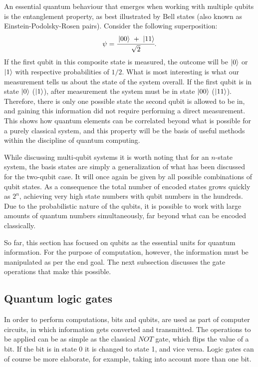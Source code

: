 An essential quantum behaviour that emerges when working with multiple qubits is the entanglement property, as best illustrated by Bell states (also known as Einstein-Podolsky-Rosen pairs). Consider the following superposition:
\begin{equation}
    \psi = \cfrac{\ket{00}\ +\ \ket{11}}{\sqrt{2}}.
\end{equation}
If the first qubit in this composite state is measured, the outcome will be $\ket{0}$ or $\ket{1}$ with respective probabilities of $1/2$. What is most interesting is what our measurement tells us about the state of the system overall. If the first qubit is in state $\ket{0}$ ($\ket{1}$), after measurement the system must be in state $\ket{00}$ ($\ket{11}$). Therefore, there is only one possible state the second qubit is allowed to be in, and gaining this information did not require performing a direct measurement. This shows how quantum elements can be correlated beyond what is possible for a purely classical system, and this property will be the basis of useful methods within the discipline of quantum computing. 

While discussing multi-qubit systems it is worth noting that for an $n$-state system, the basis states are simply a generalization of what has been discussed for the two-qubit case. It will once again be given by all possible combinations of qubit states. As a consequence the total number of encoded states grows quickly as $2^n$, achieving very high state numbers with qubit numbers in the hundreds. Due to the probabilistic nature of the qubits, it is possible to work with large amounts of quantum numbers simultaneously, far beyond what can be encoded classically.

So far, this section has focused on qubits as the essential units for quantum information. For the purpose of computation, however, the information must be manipulated as per the end goal. The next subsection discusses the gate operations that make this possible.


\subsection{Quantum logic gates}

In order to perform computations, bits and qubits, are used as part of computer circuits, in which information gets converted and transmitted. The operations to be applied can be as simple as the classical $NOT$ gate, which flips the value of a bit. If the bit is in state 0 it is changed to state 1, and vice versa. Logic gates can of course be more elaborate, for example, taking into account more than one bit.

